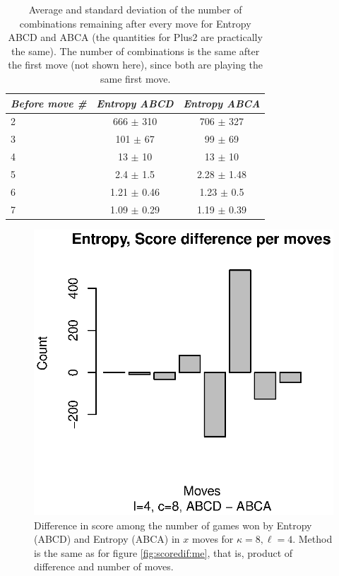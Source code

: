 \documentclass[preprint,12pt]{elsarticle}
\begin{document}
\begin{table}[!htb]
\centering
\caption{Average and standard deviation of the number of combinations
  remaining after every move for Entropy ABCD and ABCA (the quantities
  for Plus2 are practically the same). The number of combinations is the same after
  the  first move (not shown here), since both are playing the same
  first move.\label{tab:cset:abca:48}}
\smallskip
\begin{tabular}{|l|c|c|}
\hline
\emph{Before move \#} & \emph{Entropy ABCD} & \emph{Entropy ABCA} \\
\hline
2 & 666 $\pm$ 310 & 706 $\pm$ 327 \\
3 & 101 $\pm$ 67 & 99 $\pm$ 69 \\
4 & 13 $\pm$ 10 & 13 $\pm$ 10 \\ 
5 & 2.4 $\pm$ 1.5 & 2.28 $\pm$ 1.48 \\
6 & 1.21 $\pm$ 0.46 & 1.23 $\pm$ 0.5\\
7 & 1.09 $\pm$ 0.29 & 1.19 $\pm$ 0.39 \\
\hline
\end{tabular}
\end{table}
%
\begin{figure}[!htb]
\centering
\includegraphics{scoredif-abca-48.eps}
\caption{Difference in score among the number of games won by Entropy
  (ABCD) and Entropy (ABCA)  in $x$ moves for  $\kappa=8, \ell=4$. Method is the same as
  for figure \ref{fig:scoredif:me}, that is, product of difference and
  number of moves. \label{fig:scoredif:abca:48}}
\end{figure}
%
\end{document}
